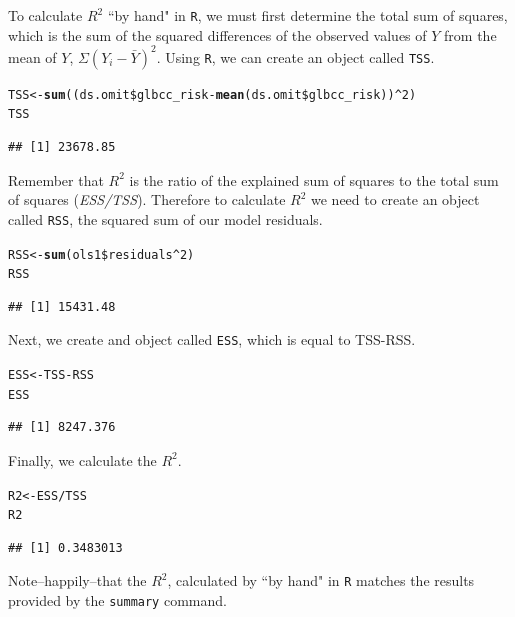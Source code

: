 \documentclass[11pt,openany]{book}\usepackage[]{graphicx}\usepackage[]{color}
\makeatletter
\newcommand{\hlnum}[1]{\textcolor[rgb]{0.686,0.059,0.569}{#1}}%
\newcommand{\hlopt}[1]{\textcolor[rgb]{0,0,0}{#1}}%
\newcommand{\hlstd}[1]{\textcolor[rgb]{0.345,0.345,0.345}{#1}}%
\newcommand{\hlkwb}[1]{\textcolor[rgb]{0.69,0.353,0.396}{#1}}%
\newcommand{\hlkwd}[1]{\textcolor[rgb]{0.737,0.353,0.396}{\textbf{#1}}}%
\newenvironment{kframe}{%
 \def\at@end@of@kframe{}%
 \ifinner\ifhmode%
  \def\at@end@of@kframe{\end{minipage}}%
  \begin{minipage}{\columnwidth}%
 \fi\fi%
 \def\FrameCommand##1{\hskip\@totalleftmargin \hskip-\fboxsep
 \colorbox{shadecolor}{##1}\hskip-\fboxsep
     \hskip-\linewidth \hskip-\@totalleftmargin \hskip\columnwidth}%
 \MakeFramed {\advance\hsize-\width
   \@totalleftmargin\z@ \linewidth\hsize
   \@setminipage}}%
 {\par\unskip\endMakeFramed%
 \at@end@of@kframe}
\newenvironment{knitrout}{}{} %
\renewenvironment{knitrout}{\begin{singlespace}}{\end{singlespace}}
\makeatother
\begin{document}
To calculate $R^{2}$ ``by hand" in \texttt{R}, we must first determine the total sum of squares, which is the sum of the squared differences of the observed values of $Y$ from the mean of $Y$, $\Sigma(Y_{i}-\bar Y)^{2}$. Using \texttt{R}, we can create an object called \texttt{TSS}. 
\begin{knitrout}
\color{fgcolor}\begin{kframe}
\begin{alltt}
\hlstd{TSS} \hlkwb{<-} \hlkwd{sum}\hlstd{((ds.omit}\hlopt{\$}\hlstd{glbcc_risk} \hlopt{-} \hlkwd{mean}\hlstd{(ds.omit}\hlopt{\$}\hlstd{glbcc_risk))}\hlopt{^}\hlnum{2}\hlstd{)}
\hlstd{TSS}
\end{alltt}
\begin{verbatim}
## [1] 23678.85
\end{verbatim}
\end{kframe}
\end{knitrout}
Remember that $R^{2}$ is the ratio of the explained sum of squares to the total sum of squares (\textit{ESS/TSS}). Therefore to calculate $R^{2}$ we need to create an object called \texttt{RSS}, the squared sum of our model residuals. 
\begin{knitrout}
\color{fgcolor}\begin{kframe}
\begin{alltt}
\hlstd{RSS} \hlkwb{<-} \hlkwd{sum}\hlstd{(ols1}\hlopt{\$}\hlstd{residuals}\hlopt{^}\hlnum{2}\hlstd{)}
\hlstd{RSS}
\end{alltt}
\begin{verbatim}
## [1] 15431.48
\end{verbatim}
\end{kframe}
\end{knitrout}
Next, we create and object called \texttt{ESS}, which is equal to TSS-RSS.
\begin{knitrout}
\color{fgcolor}\begin{kframe}
\begin{alltt}
\hlstd{ESS} \hlkwb{<-} \hlstd{TSS} \hlopt{-} \hlstd{RSS}
\hlstd{ESS}
\end{alltt}
\begin{verbatim}
## [1] 8247.376
\end{verbatim}
\end{kframe}
\end{knitrout}
Finally, we calculate the $R^{2}$. 
\begin{knitrout}
\color{fgcolor}\begin{kframe}
\begin{alltt}
\hlstd{R2} \hlkwb{<-} \hlstd{ESS}\hlopt{/}\hlstd{TSS}
\hlstd{R2}
\end{alltt}
\begin{verbatim}
## [1] 0.3483013
\end{verbatim}
\end{kframe}
\end{knitrout}
Note--happily--that the $R^{2}$, calculated by ``by hand" in \texttt{R} matches the results provided by the \texttt{summary} command.
\end{document}
